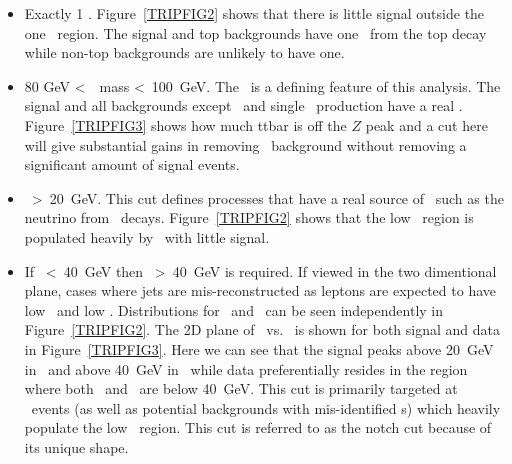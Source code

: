 \begin{itemize}
\item Exactly 1 \bjet. Figure~\ref{TRIPFIG2} shows that there is little signal outside the one \bjet~region. The signal and top backgrounds have one \bjet~from the top decay while non-top backgrounds are unlikely to have one.
\item 80 GeV \textless~\azhyph~mass \textless~100~GeV. The \az~is a defining feature of this analysis. The signal and all backgrounds except \TTB~and single \at~production have a real \az. Figure~\ref{TRIPFIG3} shows how much ttbar is off the $Z$ peak and a cut here will give substantial gains in removing \TTB~background without removing a significant amount of signal events. 
\item \met~\textgreater~20~GeV. This cut defines processes that have a real source of \met~such as the neutrino from \athyph~decays. Figure~\ref{TRIPFIG2} shows that the low \met~region is populated heavily by \zjets~with little signal.
\item If \wtm~\textless~40~GeV then \met~\textgreater~40~GeV is required. If viewed in the two dimentional plane, cases where jets are mis-reconstructed as leptons are expected to have low \wtm~and low \met. Distributions for \wtm~and \met~can be seen independently in Figure~\ref{TRIPFIG2}. The 2D plane of \wtm~vs. \met~is shown for both signal and data in Figure~\ref{TRIPFIG3}. Here we can see that the signal peaks above 20~GeV in \met~and above 40~GeV in \wtm~while data preferentially resides in the region where both \wtm~and \met~are below 40~GeV. This cut is primarily targeted at \zjets~events (as well as potential backgrounds with mis-identified \aw s) which heavily populate the low \wtm~region. This cut is referred to as the notch cut because of its unique shape. 
\end{itemize}




